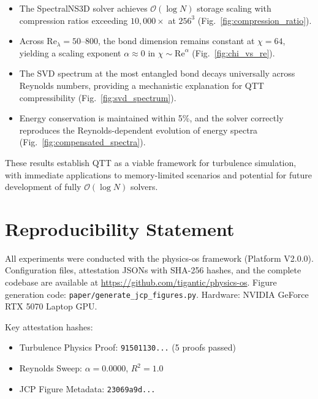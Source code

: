 \documentclass[preprint,12pt,authoryear]{elsarticle}
\newcommand{\bigO}{\mathcal{O}}
\theoremstyle{definition}
\begin{document}
\begin{itemize}
    \item The SpectralNS3D solver achieves $\bigO(\log N)$ storage scaling with compression ratios exceeding $10{,}000\times$ at $256^3$ (Fig.~\ref{fig:compression_ratio}).
    
    \item Across $\mathrm{Re}_\lambda = 50$--$800$, the bond dimension remains constant at $\chi = 64$, yielding a scaling exponent $\alpha \approx 0$ in $\chi \sim \mathrm{Re}^\alpha$ (Fig.~\ref{fig:chi_vs_re}).
    
    \item The SVD spectrum at the most entangled bond decays universally across Reynolds numbers, providing a mechanistic explanation for QTT compressibility (Fig.~\ref{fig:svd_spectrum}).
    
    \item Energy conservation is maintained within 5\%, and the solver correctly reproduces the Reynolds-dependent evolution of energy spectra (Fig.~\ref{fig:compensated_spectra}).
\end{itemize}

These results establish QTT as a viable framework for turbulence simulation, with immediate applications to memory-limited scenarios and potential for future development of fully $\bigO(\log N)$ solvers.

\section*{Reproducibility Statement}

All experiments were conducted with the physics-os framework (Platform V2.0.0).
Configuration files, attestation JSONs with SHA-256 hashes, and the complete codebase are available at \url{https://github.com/tigantic/physics-os}.
Figure generation code: \texttt{paper/generate\_jcp\_figures.py}.
Hardware: NVIDIA GeForce RTX 5070 Laptop GPU.

Key attestation hashes:
\begin{itemize}
    \item Turbulence Physics Proof: \texttt{91501130...} (5 proofs passed)
    \item Reynolds Sweep: $\alpha = 0.0000$, $R^2 = 1.0$
    \item JCP Figure Metadata: \texttt{23069a9d...}
\end{itemize}
\end{document}
